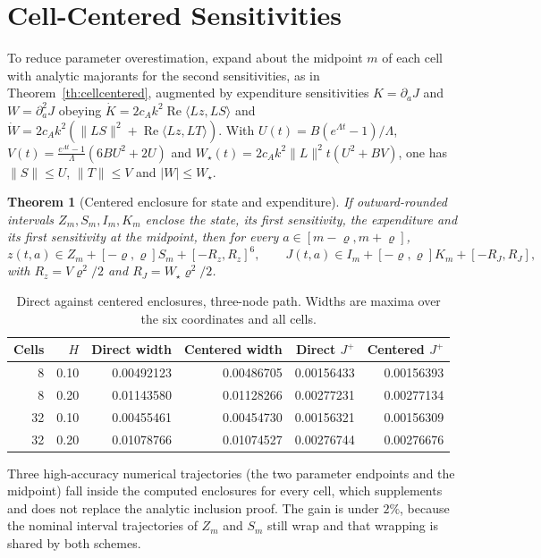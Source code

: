 \documentclass[11pt,notitlepage]{report}
\newtheorem{theorem}{Theorem}[chapter]
\theoremstyle{definition}
\theoremstyle{remark}
\newcommand{\re}{\operatorname{Re}}
\begin{document}
\section{Cell-Centered Sensitivities}
To reduce parameter overestimation, expand about the midpoint $m$ of each cell with analytic majorants for the second sensitivities, as in Theorem~\ref{th:cellcentered}, augmented by expenditure sensitivities $K=\partial_aJ$ and $W=\partial_a^2J$ obeying $\dot K=2c_Ak^2\re\langle Lz,LS\rangle$ and $\dot W=2c_Ak^2(\|LS\|^2+\re\langle Lz,LT\rangle)$. With $U(t)=B(e^{\Lambda t}-1)/\Lambda$, $V(t)=\tfrac{e^{\Lambda t}-1}{\Lambda}(6BU^2+2U)$ and $W_\star(t)=2c_Ak^2\|L\|^2t(U^2+BV)$, one has $\|S\|\le U$, $\|T\|\le V$ and $|W|\le W_\star$.
\begin{theorem}[Centered enclosure for state and expenditure]\label{th:centered}
If outward-rounded intervals $Z_m,S_m,I_m,K_m$ enclose the state, its first sensitivity, the expenditure and its first sensitivity at the midpoint, then for every $a\in[m-\varrho,m+\varrho]$,
\[
z(t,a)\in Z_m+[-\varrho,\varrho]S_m+[-R_z,R_z]^6,\qquad J(t,a)\in I_m+[-\varrho,\varrho]K_m+[-R_J,R_J],
\]
with $R_z=V\varrho^2/2$ and $R_J=W_\star\varrho^2/2$.
\end{theorem}
\begin{table}[ht]\centering\small
\caption{Direct against centered enclosures, three-node path. Widths are maxima over the six coordinates and all cells.}
\begin{tabular}{rrrrrr}\toprule
Cells&$H$&Direct width&Centered width&Direct $J^+$&Centered $J^+$\\\midrule
8&0.10&0.00492123&0.00486705&0.00156433&0.00156393\\
8&0.20&0.01143580&0.01128266&0.00277231&0.00277134\\
32&0.10&0.00455461&0.00454730&0.00156321&0.00156309\\
32&0.20&0.01078766&0.01074527&0.00276744&0.00276676\\\bottomrule
\end{tabular}
\end{table}
Three high-accuracy numerical trajectories (the two parameter endpoints and the midpoint) fall inside the computed enclosures for every cell, which supplements and does not replace the analytic inclusion proof. The gain is under $2\%$, because the nominal interval trajectories of $Z_m$ and $S_m$ still wrap and that wrapping is shared by both schemes.
\end{document}
